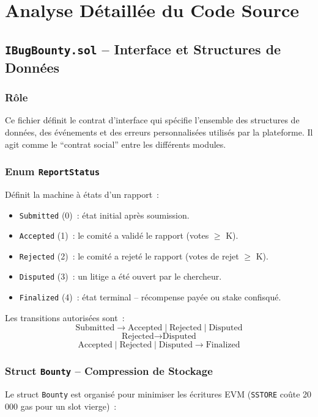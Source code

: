 \documentclass[12pt, a4paper]{report}
\begin{document}
\chapter{Analyse D\'{e}taill\'{e}e du Code Source}

\section{\texttt{IBugBounty.sol} -- Interface et Structures de Donn\'{e}es}

\subsection{R\^{o}le}
Ce fichier d\'{e}finit le contrat d'interface qui sp\'{e}cifie l'ensemble des structures de donn\'{e}es, des \'{e}v\'{e}nements et des erreurs personnalis\'{e}es utilis\'{e}s par la plateforme. Il agit comme le ``contrat social'' entre les diff\'{e}rents modules.

\subsection{Enum \texttt{ReportStatus}}
D\'{e}finit la machine \`{a} \'{e}tats d'un rapport~:
\begin{itemize}
    \item \texttt{Submitted} (0)~: \'{e}tat initial apr\`{e}s soumission.
    \item \texttt{Accepted} (1)~: le comit\'{e} a valid\'{e} le rapport (votes $\geq$ K).
    \item \texttt{Rejected} (2)~: le comit\'{e} a rejet\'{e} le rapport (votes de rejet $\geq$ K).
    \item \texttt{Disputed} (3)~: un litige a \'{e}t\'{e} ouvert par le chercheur.
    \item \texttt{Finalized} (4)~: \'{e}tat terminal -- r\'{e}compense pay\'{e}e ou stake confisqu\'{e}.
\end{itemize}

Les transitions autoris\'{e}es sont~:
$$\text{Submitted} \rightarrow \text{Accepted} \mid \text{Rejected} \mid \text{Disputed}$$
$$\text{Rejected} \rightarrow \text{Disputed}$$
$$\text{Accepted} \mid \text{Rejected} \mid \text{Disputed} \rightarrow \text{Finalized}$$

\subsection{Struct \texttt{Bounty} -- Compression de Stockage}
Le struct \texttt{Bounty} est organis\'{e} pour minimiser les \'{e}critures EVM (\texttt{SSTORE} co\^{u}te 20\,000 gas pour un slot vierge)~:
\end{document}
